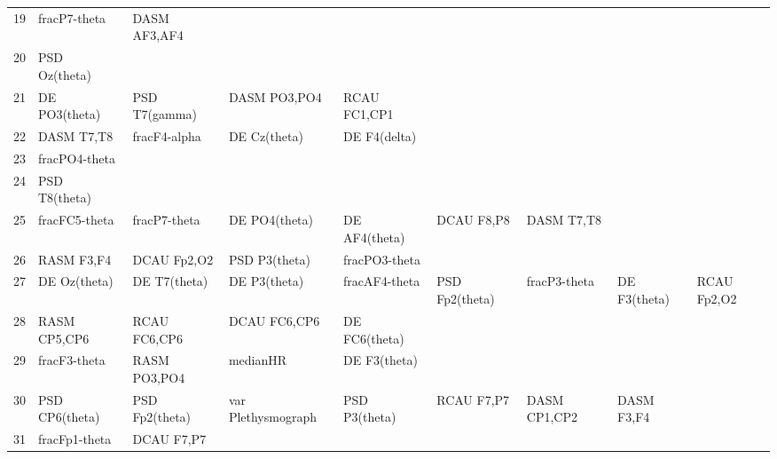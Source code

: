 \begin{landscape}
\begin{table}[]
\begin{tabular}{l|llllllll}
19                 & fracP7-theta         & DASM AF3,AF4            &                      &                    &                       &                      &                 &                 \\
20                 & PSD Oz(theta)        &                         &                      &                    &                       &                      &                 &                 \\
21                 & DE PO3(theta)        & PSD T7(gamma)           & DASM PO3,PO4         & RCAU FC1,CP1       &                       &                      &                 &                 \\
22                 & DASM T7,T8           & fracF4-alpha            & DE Cz(theta)         & DE F4(delta)       &                       &                      &                 &                 \\
23                 & fracPO4-theta        &                         &                      &                    &                       &                      &                 &                 \\
24                 & PSD T8(theta)        &                         &                      &                    &                       &                      &                 &                 \\
25                 & fracFC5-theta        & fracP7-theta            & DE PO4(theta)        & DE AF4(theta)      & DCAU F8,P8            & DASM T7,T8           &                 &                 \\
26                 & RASM F3,F4           & DCAU Fp2,O2             & PSD P3(theta)        & fracPO3-theta      &                       &                      &                 &                 \\
27                 & DE Oz(theta)         & DE T7(theta)            & DE P3(theta)         & fracAF4-theta      & PSD Fp2(theta)        & fracP3-theta         & DE F3(theta)    & RCAU Fp2,O2     \\
28                 & RASM CP5,CP6         & RCAU FC6,CP6            & DCAU FC6,CP6         & DE FC6(theta)      &                       &                      &                 &                 \\
29                 & fracF3-theta         & RASM PO3,PO4            & medianHR             & DE F3(theta)       &                       &                      &                 &                 \\
30                 & PSD CP6(theta)       & PSD Fp2(theta)          & var Plethysmograph   & PSD P3(theta)      & RCAU F7,P7            & DASM CP1,CP2         & DASM F3,F4      &                 \\
31                 & fracFp1-theta        & DCAU F7,P7              &                      &                    &                       &                      &                 &                 \\
\end{tabular}
\end{table}
\end{landscape}
